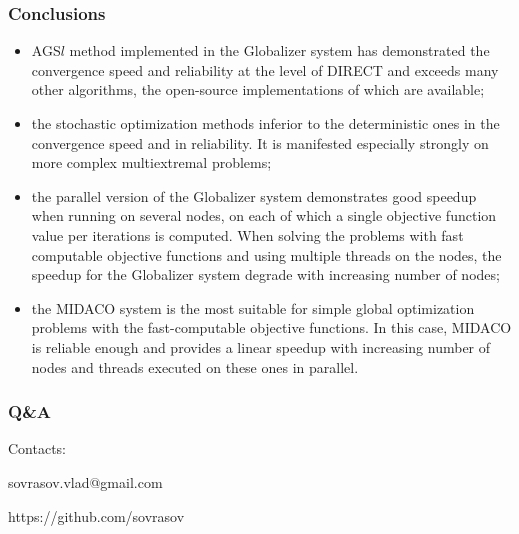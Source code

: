 \documentclass[aspectratio=1610]{beamer}
\newcommand\unnumbered{\setbeamertemplate{footline}{}}
\begin{document}
\begin{frame}
  \frametitle{Conclusions}
    \begin{itemize}
      \item AGS\(l\) method implemented in the Globalizer system has demonstrated the convergence
    speed and reliability at the level of DIRECT and exceeds many other algorithms, the open-source
    implementations of which are available;
    \item the stochastic optimization methods inferior to the deterministic ones in the convergence
  speed and in reliability. It is manifested especially strongly on more complex multiextremal
  problems;
    \item the parallel version of the Globalizer system demonstrates good speedup
  when running on several nodes, on each of which a single objective function value per iterations is
  computed. When solving the problems with fast computable objective functions and using multiple
  threads on the nodes, the speedup for the Globalizer system degrade with increasing
  number of nodes;
    \item the MIDACO system is the most suitable for simple global optimization problems with the
  fast-computable objective functions. In this case, MIDACO is reliable enough and provides a linear
  speedup with increasing number of nodes and threads executed on these ones in parallel.
    \end{itemize}
\end{frame}
{
\unnumbered
\begin{frame}{{}}
  \frametitle{Q\&A}
  \begin{center}
    \Large{Contacts:}
\vspace{0.5cm}

    sovrasov.vlad@gmail.com

    https://github.com/sovrasov
  \end{center}
\end{frame}
}
\end{document}
